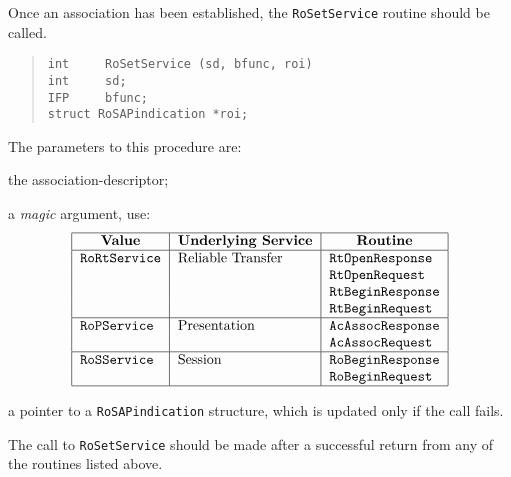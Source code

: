 Once an association has been established,
the \verb"RoSetService" routine should be called.
\begin{quote}\small\begin{verbatim}
int     RoSetService (sd, bfunc, roi)
int     sd;
IFP     bfunc;
struct RoSAPindication *roi;
\end{verbatim}\end{quote}
The parameters to this procedure are:
\begin{describe}
\item[\verb"sd":] the association-descriptor;

\item[\verb"bfunc":] a {\em magic\/} argument, use:
\[\begin{tabular}{|l|l|l|}
\hline
    \multicolumn{1}{|c|}{\bf Value}&
		\multicolumn{1}{c|}{\bf Underlying Service}&
		\multicolumn{1}{c|}{\bf Routine}\\
\hline
    \tt RoRtService&	Reliable Transfer&	\tt RtOpenResponse\\
	&		&			\tt RtOpenRequest\\
	&		&			\tt RtBeginResponse\\
	&		&			\tt RtBeginRequest\\
\hline
    \tt RoPService&	Presentation&		\tt AcAssocResponse\\
	&		&			\tt AcAssocRequest\\
\hline
    \tt RoSService&	Session&		\tt RoBeginResponse\\
	&		&			\tt RoBeginRequest\\
\hline
\end{tabular}\]

\item[\verb"roi":] a pointer to a \verb"RoSAPindication" structure,
which is updated only if the call fails.
\end{describe}
The call to \verb"RoSetService" should be made after a successful return from
any of the routines listed above.

